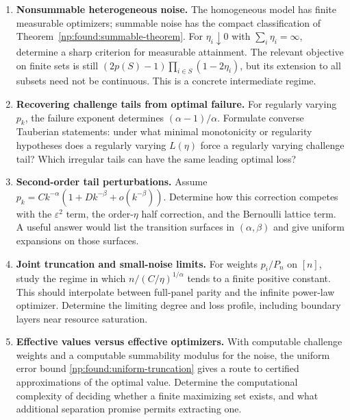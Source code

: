 \documentclass[11pt,a4paper]{article}
\theoremstyle{definition}
\theoremstyle{remark}
\begin{document}
\begin{enumerate}[label=\textbf{Q\arabic*.},ref=Q\arabic*,leftmargin=12mm]
\item\label{np:q:nonsummable} \textbf{Nonsummable heterogeneous noise.}
The homogeneous model has finite measurable optimizers; summable
noise has the compact classification of
Theorem~\ref{np:found:summable-theorem}. For
\(\eta_i\downarrow0\) with \(\sum_i\eta_i=\infty\), determine a sharp
criterion for measurable attainment. The relevant objective on finite
sets is still
\((2p(S)-1)\prod_{i\in S}(1-2\eta_i)\), but its extension to all subsets
need not be continuous. This is a concrete intermediate regime.

\item\label{np:q:tauberian} \textbf{Recovering challenge tails from optimal failure.}
For regularly varying \(p_k\), the failure exponent determines
\((\alpha-1)/\alpha\). Formulate converse Tauberian statements:
under what minimal monotonicity or regularity hypotheses does a
regularly varying \(L(\eta)\) force a regularly varying challenge tail?
Which irregular tails can have the same leading optimal loss?

\item\label{np:q:secondorder} \textbf{Second-order tail perturbations.}
Assume
\(p_k=Ck^{-\alpha}(1+Dk^{-\beta}+o(k^{-\beta}))\).
Determine how this correction competes with the \(\varepsilon^2\)
term, the order-\(\eta\) half correction, and the Bernoulli lattice
term. A useful answer would list the transition surfaces in
\((\alpha,\beta)\) and give uniform expansions on those surfaces.

\item\label{np:q:joint} \textbf{Joint truncation and small-noise limits.}
For weights \(p_i/P_n\) on \([n]\), study the regime in which
\(n/(C/\eta)^{1/\alpha}\) tends to a finite positive constant.
This should interpolate between full-panel parity and the infinite
power-law optimizer. Determine the limiting degree and loss profile,
including boundary layers near resource saturation.

\item\label{np:q:effective} \textbf{Effective values versus effective optimizers.}
With computable challenge weights and a computable summability modulus
for the noise, the uniform error bound
\eqref{np:found:uniform-truncation} gives a route to certified
approximations of the optimal value. Determine the computational
complexity of deciding whether a finite maximizing set exists, and
what additional separation promise permits extracting one.


\end{enumerate}
\end{document}
